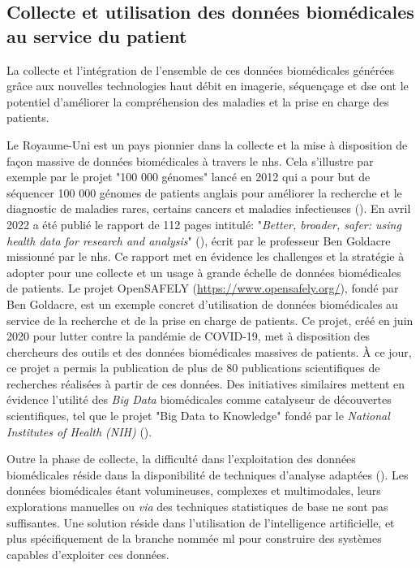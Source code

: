\subsection{Collecte et utilisation des données biomédicales au service du patient}
La collecte et l'intégration de l'ensemble de ces données biomédicales générées grâce aux nouvelles technologies haut débit en imagerie, séquençage et \gls{dse} ont le potentiel d'améliorer la compréhension des maladies et la prise en charge des patients.

Le Royaume-Uni est un pays pionnier dans la collecte et la mise à disposition de façon massive de données biomédicales à travers le \gls{nhs}. Cela s'illustre par exemple par le projet "100 000 génomes" lancé en 2012 qui a pour but de séquencer 100 000 génomes de patients anglais pour améliorer la recherche et le diagnostic de maladies rares, certains cancers et maladies infectieuses (\cite{nunn_public_2019}). En avril 2022 a été publié le rapport de 112 pages intitulé: "\textit{Better, broader, safer: using health data for research and analysis}" (\cite{ben_goldacre_better_2022}), écrit par le professeur Ben Goldacre missionné par le \gls{nhs}. Ce rapport met en évidence les challenges et la stratégie à adopter pour une collecte et un usage à grande échelle de données biomédicales de patients. Le projet OpenSAFELY (\href{https://www.opensafely.org/}{https://www.opensafely.org/}), fondé par Ben Goldacre, est un exemple concret d'utilisation de données biomédicales au service de la recherche et de la prise en charge de patients. Ce projet, créé en juin 2020 pour lutter contre la pandémie de COVID-19, met à disposition des chercheurs des outils et des données biomédicales massives de patients. À ce jour, ce projet a permis la publication de plus de 80 publications scientifiques de recherches réalisées à partir de ces données. Des initiatives similaires  mettent en évidence l'utilité des \textit{Big Data} biomédicales comme catalyseur de découvertes scientifiques, tel que le projet "Big Data to Knowledge" fondé par le \textit{National Institutes of Health (NIH)} (\cite{toga_big_2015}).

Outre la phase de collecte, la difficulté dans l'exploitation des données biomédicales réside dans la disponibilité de techniques d'analyse adaptées (\cite{wang_big_2019, ismail_requirements_2020}). Les données biomédicales étant volumineuses, complexes et multimodales, leurs explorations manuelles ou \textit{via} des techniques statistiques de base ne sont pas suffisantes. Une solution réside dans l'utilisation de l'intelligence artificielle, et plus spécifiquement de la branche nommée \gls{ml} pour construire des systèmes capables d'exploiter ces données.


